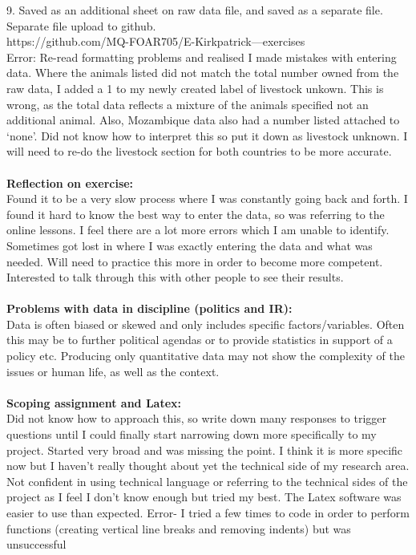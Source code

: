 \documentclass{article}
\begin{document}
9.	Saved as an additional sheet on raw data file, and saved as a separate file. Separate file upload to github.  \\
https://github.com/MQ-FOAR705/E-Kirkpatrick---exercises\\
{Error: Re-read formatting problems and realised I made mistakes with entering data. Where the animals listed did not match the total number owned from the raw data, I added a 1 to my newly created label of livestock unkown. This is wrong, as the total data reflects a mixture of the animals specified not an additional animal. Also, Mozambique data also had a number listed attached to ‘none’. Did not know how to interpret this so put it down as livestock unknown. I will need to re-do the livestock section for both countries to be more accurate.}\\
\\
\textbf{Reflection on exercise:}\\
Found it to be a very slow process where I was constantly going back and forth. I found it hard to know the best way to enter the data, so was referring to the online lessons. I feel there are a lot more errors which I am unable to identify. Sometimes got lost in where I was exactly entering the data and what was needed. Will need to practice this more in order to become more competent. Interested to talk through this with other people to see their results. \\
\\
\textbf{Problems with data in discipline (politics and IR):}\\
Data is often biased or skewed and only includes specific factors/variables. Often this may be to further political agendas or to provide statistics in support of a policy etc.
Producing only quantitative data may not show the complexity of the issues or human life, as well as the context.\\
\\
\textbf{Scoping assignment and Latex:}\\
Did not know how to approach this, so write down many responses to trigger questions until I could finally start narrowing down more specifically to my project. Started very broad and was missing the point. I think it is more specific now but I haven’t really thought about yet the technical side of my research area. \\
Not confident in using technical language or referring to the technical sides of the project as I feel I don’t know enough but tried my best.
The Latex software was easier to use than expected.
{Error- I tried a few times to code in order to perform functions (creating vertical line breaks and removing indents) but was unsuccessful}
\end{document}
